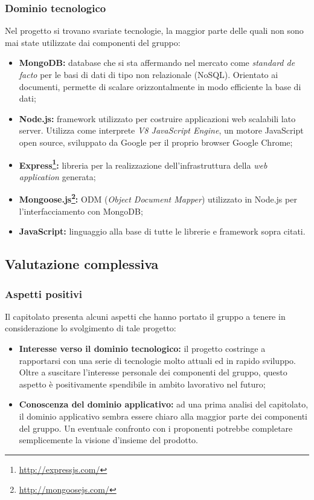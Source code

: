 \subsubsection{Dominio tecnologico}
\label{dominiotec1}
Nel progetto si trovano svariate tecnologie, la maggior parte delle quali non sono mai state utilizzate dai componenti del gruppo:
\begin{itemize}
\item\textbf{MongoDB:} database che si sta affermando nel mercato come \textit{standard de facto} per le basi di dati di tipo non relazionale (NoSQL). Orientato ai documenti, permette di scalare orizzontalmente in modo efficiente la base di dati;
\item\textbf{Node.js:} framework\glossario{} utilizzato per costruire applicazioni web scalabili lato server. Utilizza come interprete \textit{V8 JavaScript Engine}, un motore JavaScript open source, sviluppato da Google per il proprio browser Google Chrome;
\item\textbf{Express\footnote{\url{http://expressjs.com/}}:} libreria per la realizzazione dell'infrastruttura della \textit{web application} generata;
\item\textbf{Mongoose.js\footnote{\url{http://mongoosejs.com/}}:} ODM (\textit{Object Document Mapper}) utilizzato in Node.js per l'interfacciamento con MongoDB;
\item\textbf{JavaScript:} linguaggio alla base di tutte le librerie e framework\glossario{} sopra citati.
\end{itemize} 
\subsection{Valutazione complessiva}
\label{valutazione1}
\subsubsection{Aspetti positivi}
\label{aspettipos1}
Il capitolato presenta alcuni aspetti che hanno portato il gruppo a tenere in considerazione lo svolgimento di tale progetto:
\begin{itemize}
\item\textbf{Interesse verso il dominio tecnologico:} il progetto costringe a rapportarsi con una serie di tecnologie molto attuali ed in rapido sviluppo. Oltre a suscitare l'interesse personale dei componenti del gruppo, questo aspetto è positivamente spendibile in ambito lavorativo nel futuro;
\item\textbf{Conoscenza del dominio applicativo:} ad una prima analisi del capitolato, il dominio applicativo sembra essere chiaro alla maggior parte dei componenti del gruppo. Un eventuale confronto con i proponenti potrebbe completare semplicemente la visione d'insieme del prodotto.
\end{itemize}

